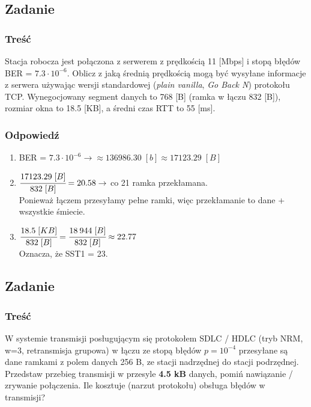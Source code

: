 \newpage
	\subsection{Zadanie}
		\subsubsection{Treść}	
			Stacja robocza jest połączona z serwerem z prędkością 11 [Mbps] i stopą błędów BER = $ 7.3 \cdot 10 ^ {-6} $. Oblicz z jaką średnią prędkością mogą być wysyłane informacje z serwera używając wersji standardowej (\emph{plain vanilla}, \emph{Go Back N}) protokołu TCP. Wynegocjowany segment danych to 768 [B] (ramka w łączu 832 [B]), rozmiar okna to 18.5 [KB], a średni czas RTT to 55 [ms].
		\subsubsection{Odpowiedź}
			\begin{enumerate}
				\item BER = $ 7.3 \cdot 10 ^ {-6} \rightarrow\approx 136986.30\;[b] \approx 17123.29\;[B] $
				\item $ \cfrac{17123.29\;[B]}{832\;[B]}=20.58 \rightarrow $ co 21 ramka przekłamana.\\
				Ponieważ łączem przesyłamy pełne ramki, więc przekłamanie to dane + wszystkie śmiecie.
				\item $ \cfrac{18.5\;[KB]}{832\;[B]}=\cfrac{18\:944\;[B]}{832\;[B]}\approx22.77 $\\
				Oznacza, że SST1 = 23.
			\end{enumerate}
			
			
			
\newpage
	\subsection{Zadanie}
		\subsubsection{Treść}
			W systemie transmisji posługującym się protokołem SDLC / HDLC (tryb NRM, w=3, retransmisja grupowa) w łączu ze stopą błędów $ p=10^{-4} $ przesyłane są dane ramkami z polem danych 256 B, ze stacji nadrzędnej do stacji podrzędnej. Przedstaw przebieg transmisji w przesyle \textbf{4.5 kB} danych, pomiń nawiązanie / zrywanie połączenia. Ile kosztuje (narzut protokołu) obsługa błędów w transmisji?

